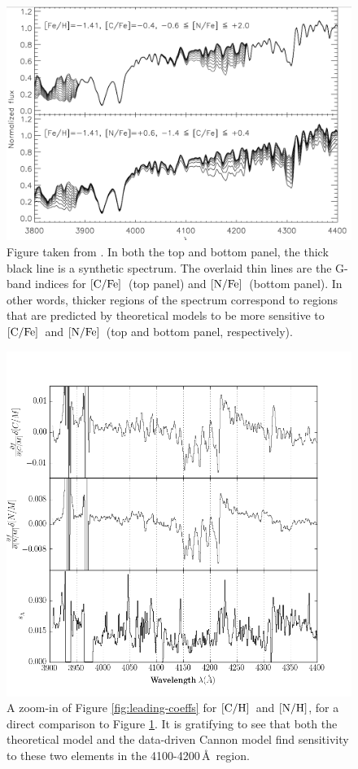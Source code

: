 \documentclass[12pt, preprint]{aastex}
\newcommand{\carbon}{\mbox{$\rm [C/H]$}}
\newcommand{\cfe}{\mbox{$\rm [C/Fe]$}}
\newcommand{\nitrogen}{\mbox{$\rm [N/H]$}}
\newcommand{\nfe}{\mbox{$\rm [N/Fe]$}}
\newcommand{\angstrom}{\mbox{\AA}}
\begin{document}
\begin{figure}[!p]
\centering
\includegraphics[scale=0.4]{model_c_n.png}
\caption{
Figure taken from \citet{Martell2008}. In both the 
top and bottom panel, the thick black line is
a synthetic spectrum. The overlaid thin lines are
the G-band indices for \cfe\ (top panel) and
\nfe\ (bottom panel). In other words, thicker
regions of the spectrum correspond to regions that
are predicted by theoretical models to be more 
sensitive to \cfe\ and \nfe\ (top and bottom panel, respectively). 
}
\label{fig:model-cn}
\end{figure}

\begin{figure}[!p]
\centering
\includegraphics[scale=0.8]{leading_coeffs_ages_zoom.png}
\caption{
A zoom-in of Figure \ref{fig:leading-coeffs} for 
\carbon\ and \nitrogen, 
for a direct comparison to Figure \ref{fig:model-cn}.
It is gratifying to see that both the theoretical model and the data-driven Cannon
model find sensitivity to these two elements
in the 4100-4200\,\angstrom\ region. 
}
\label{fig:cannon-cn}
\end{figure}
\end{document}
